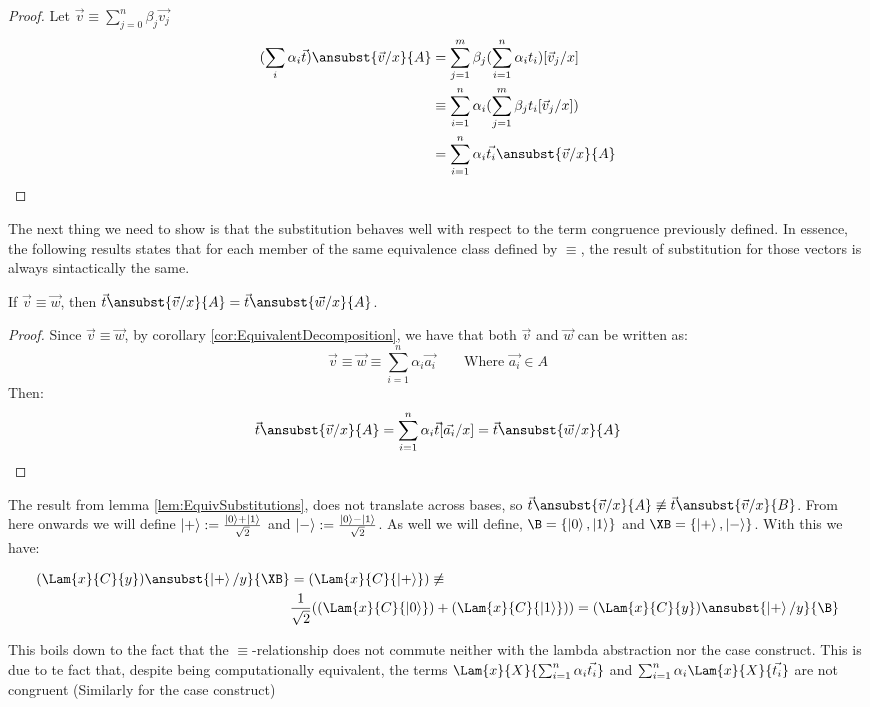 \begin{proof}
  Let $\vec{v}\equiv\sum\limits_{j=0}^n \beta_j \vec{v_j}$
  \begin{align*}
    (\sum_i \alpha_i\vec t)\ansubst{\vec v/x}{A} &= \sum_{j=1}^m \beta_j(\sum_{i=1}^{n} \alpha_i t_i)[\vec v_j/x]\\
    &\equiv \sum_{i=1}^{n} \alpha_i (\sum_{j=1}^m \beta_j t_i [\vec v_j/x])\\
    &= \sum_{i=1}^{n} \alpha_i \vec{t_i}\ansubst{\vec v/x}{A}
  \end{align*}
\end{proof}

The next thing we need to show is that the substitution behaves well with respect to the term congruence previously defined. In essence, the following results states that for each member of the same equivalence class defined by $\equiv$, the result of substitution for those vectors is always sintactically the same.

\begin{lemma}\label{lem:EquivSubstitutions}
  If $\vec{v}\equiv\vec{w}$, then $\vec{t}\ansubst{\vec{v}/x}{A}=\vec{t}\ansubst{\vec{w}/x}{A}$.
\end{lemma}

\begin{proof}
  Since $\vec{v}\equiv\vec{w}$, by corollary \ref{cor:EquivalentDecomposition}, we have that both $\vec{v}$ and $\vec{w}$ can be written as:
  \[
  \vec{v} \equiv \vec{w} \equiv \sum_{i=1}^{n} \alpha_i \vec{a_i}\qquad\text{Where }\vec{a_i}\in A
  \]
  Then:
  \[
  \vec{t}\ansubst{\vec{v}/x}{A} = \sum_{i=1}^{n} \alpha_i \vec{t}[\vec{a_i}/x] = \vec{t}\ansubst{\vec{w}/x }{A}
  \]
\end{proof}

\begin{remark}
  The result from lemma \ref{lem:EquivSubstitutions}, does not translate across bases, so $\vec{t}\ansubst{\vec{v}/x}{A} \not\equiv \vec{t}\ansubst{\vec{v}/x}{B}$. From here onwards we will define $\ket{+}:=\frac{\ket{0}+\ket{1}}{\sqrt{2}}$ and $\ket{-}:=\frac{\ket{0}-\ket{1}}{\sqrt{2}}$. As well we will define, $\B = \{\ket{0}, \ket{1}\}$ and $\XB = \{\ket{+}, \ket{-}\}$. With this we have:
  
  \begin{align*}
    (\Lam{x}{C}{y})\ansubst{\ket{+}/y}{\XB} &= (\Lam{x}{C}{\ket{+}}) 
    \not\equiv \\ 
    &\frac{1}{\sqrt{2}} ((\Lam{x}{C}{\ket{0}}) + (\Lam{x}{C}{\ket{1}}))
    = (\Lam{x}{C}{y})\ansubst{\ket{+}/y}{\B}
  \end{align*}
  
  This boils down to the fact that the $\equiv$-relationship does not commute neither with the lambda abstraction nor the case construct. This is due to te fact that, despite being computationally equivalent, the terms $\Lam{x}{X}{\sum_{i=1}^{n}\alpha_i \vec{t_i}}$ and $\sum_{i=1}^{n}\alpha_i \Lam{x}{X}{\vec{t_i}}$ are not congruent (Similarly for the case construct)
\end{remark}

